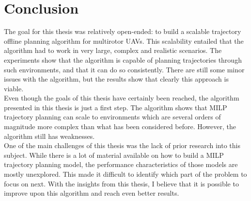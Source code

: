 \section{Conclusion}
The goal for this thesis was relatively open-ended: to build a scalable trajectory offline planning algorithm for multirotor UAVs. This scalability entailed that the algorithm had to work in very large, complex and realistic scenarios. The experiments show that the algorithm is capable of planning trajectories through such environments, and that it can do so consistently. There are still some minor issues with the algorithm, but the results show that clearly this approach is viable. \\
Even though the goals of this thesis have certainly been reached, the algorithm presented in this thesis is just a first step. The algorithm shows that MILP trajectory planning can scale to environments which are several orders of magnitude more complex than what has been considered before. However, the algorithm still has weaknesses. \\
One of the main challenges of this thesis was the lack of prior research into this subject. While there is a lot of material available on how to build a MILP trajectory planning model, the performance characteristics of those models are mostly unexplored. This made it difficult to identify which part of the problem to focus on next. With the insights from this thesis, I believe that it is possible to improve upon this algorithm and reach even better results.


